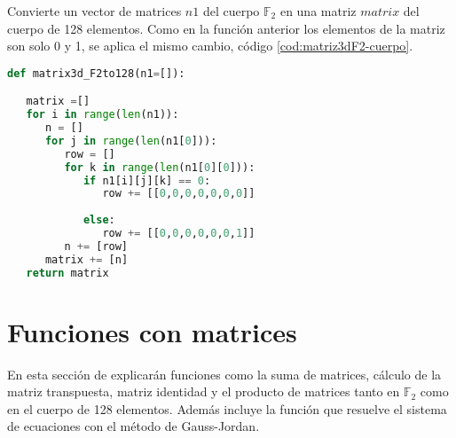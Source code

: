 Convierte un vector de matrices $n1$ del cuerpo $\mathds{F}_2$ en una matriz $matrix$ del cuerpo de 128 elementos. Como en la función anterior los elementos de la matriz son solo 0 y 1, se aplica el mismo cambio, código \ref{cod:matriz3dF2-cuerpo}.

\begin{table}[h]
	\begin{center}
	\centering
	\end{center}
	\caption{Parámetros de la función \texttt{matrix3d\_F2to128}}
\end{table}

\vspace{0.25cm}

\begin{lstlisting}[language=Python,caption=Vector de matrices de $\mathds{F}_2$ a una matriz del cuerpo de 128 elementos, label=cod:matriz3dF2-cuerpo]
def matrix3d_F2to128(n1=[]):

   matrix =[]
   for i in range(len(n1)):
      n = []
      for j in range(len(n1[0])):
         row = []
         for k in range(len(n1[0][0])):
            if n1[i][j][k] == 0:
               row += [[0,0,0,0,0,0,0]]
               
            else:
               row += [[0,0,0,0,0,0,1]]
         n += [row]
      matrix += [n]
   return matrix
\end{lstlisting}

\section{Funciones con matrices}

En esta sección de explicarán funciones como la suma de matrices, cálculo de la matriz transpuesta, matriz identidad y el producto de matrices tanto en $\mathds{F}_2$ como en el cuerpo de 128 elementos. Además incluye la función que resuelve el sistema de ecuaciones con el método de Gauss-Jordan.\\



